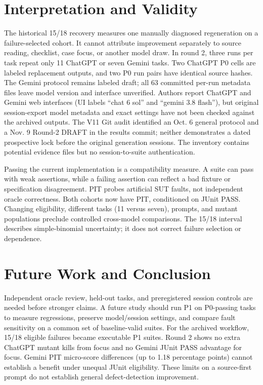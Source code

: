 \documentclass[conference]{IEEEtran}
\begin{document}
\section{Interpretation and Validity}
The historical 15/18 recovery measures one manually diagnosed regeneration on a failure-selected cohort. It cannot attribute improvement separately to source reading, checklist, case focus, or another model draw. In round 2, three runs per task repeat only 11 ChatGPT or seven Gemini tasks. Two ChatGPT P0 cells are labeled replacement outputs, and two P0 run pairs have identical source hashes. The Gemini protocol remains labeled draft; all 63 committed per-run metadata files leave model version and interface unverified. Authors report ChatGPT and Gemini web interfaces (UI labels ``chat 6 sol'' and ``gemini 3.8 flash''), but original session-export model metadata and exact settings have not been checked against the archived outputs. The V11 Git audit identified an Oct. 6 general protocol and a Nov. 9 Round-2 DRAFT in the results commit; neither demonstrates a dated prospective lock before the original generation sessions. The inventory contains potential evidence files but no session-to-suite authentication.

Passing the current implementation is a compatibility measure. A suite can pass with weak assertions, while a failing assertion can reflect a bad fixture or specification disagreement. PIT probes artificial SUT faults, not independent oracle correctness. Both cohorts now have PIT, conditioned on JUnit PASS. Changing eligibility, different tasks (11 versus seven), prompts, and mutant populations preclude controlled cross-model comparisons. The 15/18 interval describes simple-binomial uncertainty; it does not correct failure selection or dependence.

\section{Future Work and Conclusion}
Independent oracle review, held-out tasks, and preregistered session controls are needed before stronger claims. A future study should run P1 on P0-passing tasks to measure regressions, preserve model/session settings, and compare fault sensitivity on a common set of baseline-valid suites. For the archived workflow, 15/18 eligible failures became executable P1 suites. Round 2 shows no extra ChatGPT mutant kills from focus and no Gemini JUnit PASS advantage for focus. Gemini PIT micro-score differences (up to 1.18 percentage points) cannot establish a benefit under unequal JUnit eligibility. These limits on a source-first prompt do not establish general defect-detection improvement.
\end{document}
